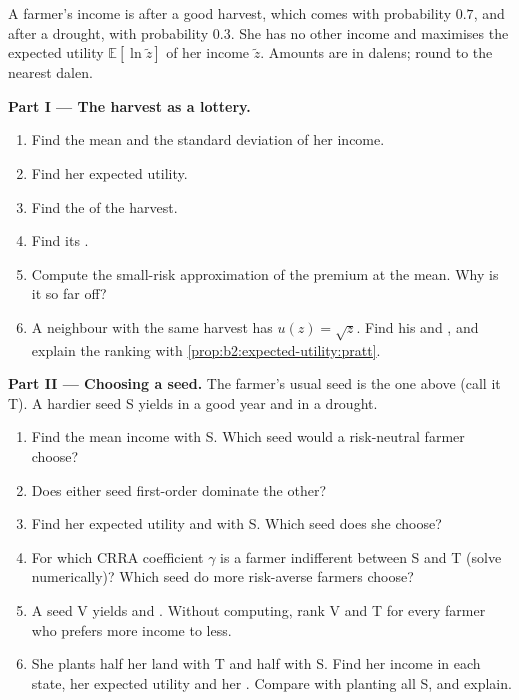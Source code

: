 \begin{problem}
\label{pb:b2:expected-utility:1}
A farmer's income is  after a good harvest, which comes with probability $0.7$, and
 after a drought, with probability $0.3$. She has no other income and maximises the
expected utility $\mathbb{E}[\ln \tilde z]$ of her income $\tilde z$. Amounts are in dalens; round to
the nearest dalen.

\medskip
\noindent\textbf{Part I --- The harvest as a lottery.}
\begin{enumerate}
  \item Find the mean and the standard deviation of her income.
  \item Find her expected utility.
  \item Find the  of the harvest.
  \item Find its .
  \item Compute the small-risk approximation of the premium at the mean. Why is it so far off?
  \item A neighbour with the same harvest has $u(z) = \sqrt z$. Find his  and , and explain the ranking with \cref{prop:b2:expected-utility:pratt}.
\end{enumerate}

\medskip
\noindent\textbf{Part II --- Choosing a seed.}
The farmer's usual seed is the one above (call it T). A hardier seed S yields  in a good
year and  in a drought.
\begin{enumerate}[resume]
  \item Find the mean income with S. Which seed would a risk-neutral farmer choose?
  \item Does either seed first-order dominate the other?
  \item Find her expected utility and  with S. Which seed does she choose?
  \item For which CRRA coefficient $\gamma$ is a farmer indifferent between S and T (solve
        numerically)? Which seed do more risk-averse farmers choose?
  \item A seed V yields  and . Without computing, rank V and T for every farmer
        who prefers more income to less.
  \item She plants half her land with T and half with S. Find her income in each state, her expected
        utility and her . Compare with planting all S, and explain.
\end{enumerate}


\end{problem}
